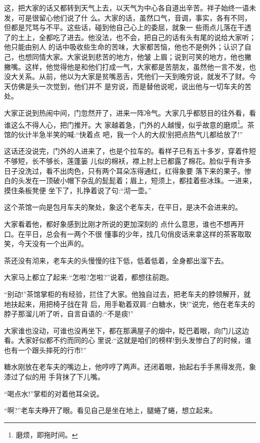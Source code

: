 \documentclass[11pt,a4paper,onecolumn]{article}
\begin{document}
这，把大家的话又都转到天气上去，以天气为中心各自道出辛苦。祥子始终一语未发，可是很留心他们说了什
么。大家的话，虽然口气，音调，事实，各有不同，但都是咒骂与不平。这些话，碰到他自己心上的委屈，就象一
些雨点儿落在干透了的土上，全都吃了进去。他没法，也不会，把自己的话有头有尾的说给大家听；他只能由别人
的话中吸收些生命的苦味，大家都苦恼，他也不是例外；认识了自己，也想同情大家。大家说到悲苦的地方，他皱
上眉；说到可笑的地方，他也撇撇嘴。这样，他觉得他是和他们打成一气，大家都是苦朋友，虽然他一言不发，也
没大关系。从前，他以为大家是贫嘴恶舌，凭他们一天到晚穷说，就发不了财。今天仿佛是头一次觉到，他们并不
是穷说，而是替他说呢，说出他与一切车夫的苦处。

大家正说到热闹中间，门忽然开了，进来一阵冷气。大家几乎都怒目的往外看，看谁这么不得人心，把门推开。大
家越着急，门外的人越慢，似乎故意的磨烦\footnote{磨烦，即拖时间。}。茶馆的伙计半急半笑的喊:``快着点
吧，我一个人的大叔!别把点热气儿都给放了!''

这话还没说完，门外的人进来了，也是个拉车的。看样子已有五十多岁，穿着件短不够短，长不够长，莲蓬篓
儿似的棉袄，襟上肘上已都露了棉花。脸似乎有许多日子没洗过，看不出肉色，只有两个耳朵冻得通红，红得象要
落下来的果子。惨白的头发在一顶破小帽下杂乱的髭髭着；眉上，短须上，都挂着些冰珠。一进来，摸住条板凳便
坐下了，扎挣着说了句:``沏一壶。''

这个茶馆一向是包月车夫的聚处，象这个老车夫，在平日，是决不会进来的。

大家看着他，都好象感到比刚才所说的更加深刻的 点什么意思，谁也不想再开口。在平日，总会有一两个不很
懂事的少年，找几句俏皮话来拿这样的茶客取取笑，今天没有一个出声的。

茶还没有沏来，老车夫的头慢慢的往下低，低着低着，全身都出溜下去。

大家马上都立了起来:``怎啦?怎啦?''说着，都想往前跑。

``别动!''茶馆掌柜的有经验，拦住了大家。他独自过去，把老车夫的脖领解开，就地扶起来，用把椅子戗在背
后，用手勒着双肩:``白糖水，快!''说完，他在老车夫的脖子那溜儿听了听，自言自语的:``不是痰!''

大家谁也没动，可谁也没再坐下，都在那满屋子的烟中，眨巴着眼，向门儿这边看。大家好似都不约而同的心
里说:``这就是咱们的榜样!到头发惨白了的时候，谁也有一个跟头摔死的行市!''

糖水刚放在老车夫的嘴边上，他哼哼了两声。还闭着眼，抬起右手\myrule 手黑得发亮，象漆过了似的\myrule 用
手背抹了下儿嘴。

``喝点水!''掌柜的对着他耳朵说。

``啊?''老车夫睁开了眼。看见自己是坐在地上，腿蜷了蜷，想立起来。
\end{document}
